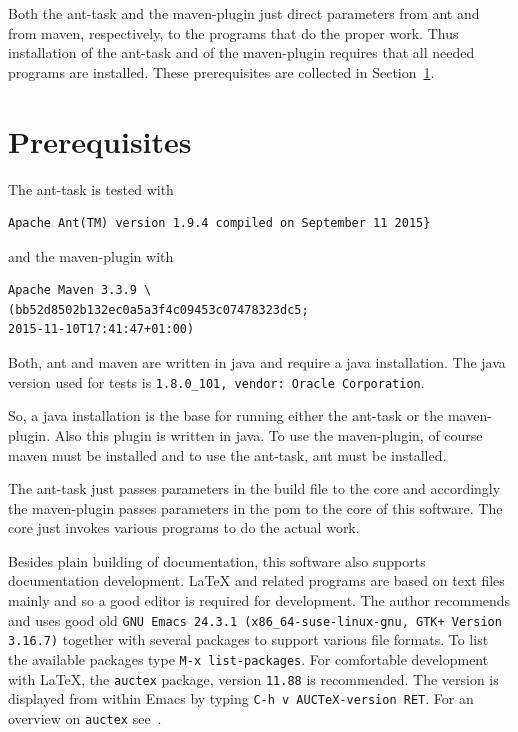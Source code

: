 \documentclass[12pt]{book}
\renewcommand{\index}[1]{ }
\begin{document}
Both the ant-task and the maven-plugin just direct parameters 
from ant and from maven, respectively, 
to the programs that do the proper work. 
Thus installation of the ant-task and of the maven-plugin 
requires that all needed programs are installed. 
These prerequisites are collected in Section~\ref{sec:prerequisites}. 
\index{ant-task}

\section{Prerequisites}\label{sec:prerequisites}

The ant-task is tested with \index{ant}
%
\begin{verbatim}
Apache Ant(TM) version 1.9.4 compiled on September 11 2015}
\end{verbatim}
%
and the maven-plugin with 
%
\index{maven}
\begin{verbatim}
Apache Maven 3.3.9 \
(bb52d8502b132ec0a5a3f4c09453c07478323dc5; 
2015-11-10T17:41:47+01:00)
\end{verbatim}
%
Both, ant and maven are written in java and require a java installation. 
The java\index{java} version used for tests 
is \texttt{1.8.0\_101, vendor: Oracle Corporation}. 


So, a java installation is the base for running either the ant-task 
or the maven-plugin. 
Also this plugin is written in java. 
To use the maven-plugin, of course maven must be installed 
and to use the ant-task, ant must be installed. 

The ant-task just passes parameters in the build file to the core 
and accordingly the maven-plugin passes parameters in the pom 
to the core of this software. 
The core just invokes various programs to do the actual work. 
\index{ant-task}

Besides plain building of documentation, 
this software also supports documentation development. 
\LaTeX{} and related programs are based on text files mainly 
and so a good editor is required for development. 
The author recommends and uses good old 
\texttt{GNU Emacs 24.3.1 (x86\_64-suse-linux-gnu, GTK+ Version 3.16.7)} 
together with several packages to support 
various file formats. 
To list the available packages type 
\texttt{M-x list-packages}. 
For comfortable development with \LaTeX, 
the \texttt{auctex} package, version \texttt{11.88} is recommended. 
The version is displayed from within Emacs 
by typing \texttt{C-h v AUCTeX-version RET}. 
For an overview on \texttt{auctex} see~\cite{AucTeX}. 
\end{document}
